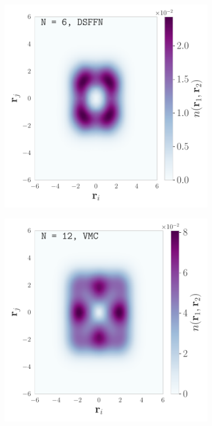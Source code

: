 \begin{figure}[H]
\begin{subfigure}[t]{0.32\textwidth}
        \hspace{-1cm}
    \end{subfigure}
    \begin{subfigure}[t]{0.32\textwidth}
        \centering
        \includegraphics[width=\textwidth]{Chapters/Results/dots/two_body_density_N[6]_nqs_DSFFN_0.5.pdf}
        \hspace{-1cm}
    \end{subfigure}
    \begin{subfigure}[t]{0.32\textwidth}
        \centering
        \includegraphics[width=\textwidth]{Chapters/Results/dots/two_body_density_N[12]_nqs_VMC_0.5.pdf}

\end{subfigure}
\end{figure}

